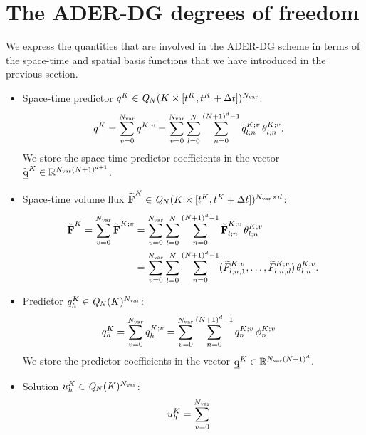 \documentclass{scrreprt}
\theoremstyle{definition}
\theoremstyle{nonumberplain}
\renewcommand{\vec}[1]{{\textbf{#1}}}
\newcommand{\stvec}[1]{\widetilde{\vec{#1}}}
\newcommand{\laVec}[1]{\underline{\mathrm{#1}}}
\newcommand{\cell}{K}
\newcommand{\polyspace}[3]{\mathit{#1}_{#2}(#3)}
\begin{document}
\section{The ADER-DG degrees of freedom}
We express the quantities
that are involved in the
ADER-DG scheme in terms of
the space-time and spatial basis
functions that we have introduced in
the previous section.
\begin{itemize}
  \item Space-time predictor
  $q^\cell\in\polyspace{Q}{N}{\cell\times[t^\cell,t^\cell+\Delta
  t]}^{N_\textup{var}}$:
  \begin{align*}
  q^{\cell}
  &=
  \sum_{v=0}^{N_\textup{var}}
  q^{\cell;v}
  =
  \sum_{v=0}^{N_\textup{var}}
  \sum_{l=0}^{N}
  \sum_{n=0}^{(N+1)^{d}-1}
  \widetilde{q}^{\cell;v}_{l;n}\,
  \theta^{\cell;v}_{l;n}.
  \end{align*}
  We store the space-time predictor coefficients in the vector
  $\laVec{\widetilde{q}}^\cell\in\mathbb{R}^{N_\textup{var}(N+1)^{d+1}}$.
  \item Space-time volume flux
  $\stvec{F}^{\cell}\in\polyspace{Q}{N}{\cell\times[t^\cell,t^\cell+\Delta
  t]}^{N_\textup{var}\times d}$:
  \begin{align*}
  \stvec{F}^\cell
  =
  \sum_{v=0}^{N_\textup{var}}
  \stvec{F}^{K;v}
  &=
  \sum_{v=0}^{N_\textup{var}}
  \sum_{l=0}^{N}
  \sum_{n=0}^{(N+1)^d-1}
  \stvec{F}^{K;v}_{l;n}\,{\theta}^{K;v}_{l;n} \\
  &=
  \sum_{v=0}^{N_\textup{var}}
  \sum_{l=0}^{N}
  \sum_{n=0}^{(N+1)^d-1}
  (\widetilde{F}^{K;v}_{l;n,1},\ldots,\widetilde{F}^{K;v}_{l;n,d})\,{\theta}^{K;v}_{l;n}.
  \end{align*}
  \item Predictor $q_h^{\cell}\in\polyspace{Q}{N}{\cell}^{N_\textup{var}}$:
  \begin{align*}
  q_h^{\cell}
  &=
  \sum_{v=0}^{N_\textup{var}}
  q_h^{\cell;v}
  =
  \sum_{v=0}^{N_\textup{var}}
  \sum_{n=0}^{(N+1)^{d}-1}
  q^{\cell;v}_{n}\,
  \phi^{\cell;v}_{n}
  \end{align*}	  
  We store the predictor coefficients in the vector
  $\laVec{q}^\cell\in\mathbb{R}^{N_\textup{var}(N+1)^{d}}$.
  \item Solution $u_h^{\cell}\in\polyspace{Q}{N}{\cell}^{N_\textup{var}}$:
  \begin{align*}
  u_h^{\cell}
  &=
  \sum_{v=0}^{N_\textup{var}}

\end{align*}
\end{itemize}
\end{document}
